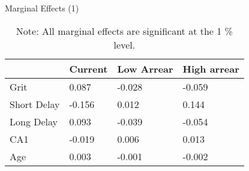\begin{table}[h]
\centering
\caption{Marginal Effects (1)}
\label{tab:reg2}
\begin{tabular}{@{}llll@{}}
\toprule
            & Current & Low Arrear & High arrear \\ \midrule
Grit        & 0.087   & -0.028     & -0.059      \\
Short Delay & -0.156  & 0.012      & 0.144       \\
Long Delay  & 0.093   & -0.039     & -0.054      \\
CA1         & -0.019  & 0.006      & 0.013       \\
Age         & 0.003   & -0.001     & -0.002      \\ \bottomrule
\end{tabular}%
\caption*{\footnotesize{Note: All marginal effects are significant at the 1 \% level.}}
\end{table}